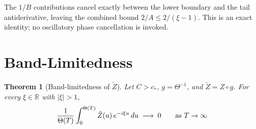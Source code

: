 \documentclass{amsart}
\newtheorem{theorem}{Theorem}
\begin{document}
\begin{remark}
  The $1 / B$ contributions cancel exactly between the lower boundary and the
  tail antiderivative, leaving the combined bound $2 / A \le 2 / (\xi - 1)$.
  This is an exact identity; no oscillatory phase cancellation is invoked.
\end{remark}

\section{Band-Limitedness}

\begin{theorem}
  [Band-limitedness of $\tilde{Z}$]\label{thm:band} Let $C > c_{\ast}$, $g =
  \Theta^{- 1}$, and $\tilde{Z} = Z \circ g$. For every $\xi \in \mathbb{R}$
  with $| \xi | > 1$,
  \begin{equation}
    \frac{1}{\Theta (T)}  \int_0^{\Theta (T)} \tilde{Z} (u)  \hspace{0.17em}
    e^{- i \xi u}  \hspace{0.17em} du \hspace{0.27em} \longrightarrow
    \hspace{0.27em} 0 \qquad \text{as } T \to \infty
  \end{equation}
\end{theorem}
\end{document}

